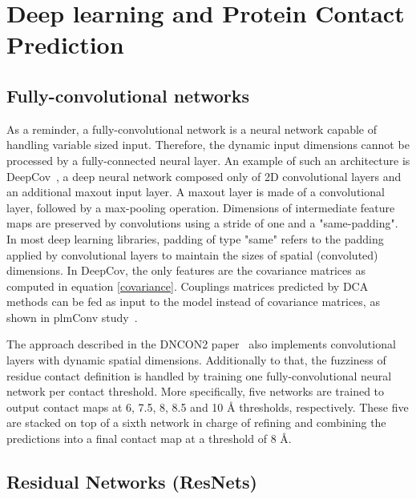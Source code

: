 \section{Deep learning and Protein Contact Prediction} \label{dlpredictors}

    \subsection{Fully-convolutional networks}

        As a reminder, a fully-convolutional network is a neural network capable
        of handling variable sized input. Therefore, the dynamic input dimensions
        cannot be processed by a fully-connected neural layer.
        An example of such an architecture is DeepCov~\cite{doi:10.1093/bioinformatics/bty341},
        a deep neural network composed only of 2D convolutional layers and an additional
        maxout input layer. A maxout layer is made of a convolutional layer, followed
        by a max-pooling operation. Dimensions of intermediate feature maps are preserved
        by convolutions using a stride of one and a "same-padding". In most deep learning
        libraries, padding of type "same" refers to the padding applied by convolutional layers
        to maintain the sizes of spatial (convoluted) dimensions.
        In DeepCov, the only features are the covariance matrices as computed
        in equation \ref{covariance}. Couplings matrices predicted by DCA methods can be fed as
        input to the model instead of covariance matrices, as shown in plmConv study~\cite{golkov2016protein}.

        The approach described in the DNCON2 paper~\cite{doi:10.1093/bioinformatics/bty341}
        also implements convolutional layers with dynamic spatial dimensions.
        Additionally to that, the fuzziness of residue contact definition is handled
        by training one fully-convolutional neural network per contact threshold.
        More specifically, five networks are trained to output contact maps at 6, 7.5, 8, 8.5 and 10 \AA{}
        thresholds, respectively. These five are stacked on top of a sixth network in charge
        of refining and combining the predictions into a final contact map at a threshold of 8 \AA{}.

    \subsection{Residual Networks (ResNets)}


